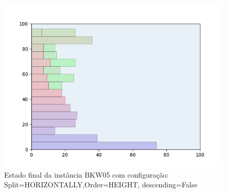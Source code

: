 \begin{figure}[H]
    \centering
    \caption[]{Estado final da instância BKW05 com configuração: Split=HORIZONTALLY,Order=HEIGHT, descending=False}
    \label{fig:bkw05-horizontally-height-false}
    \includegraphics[scale=0.5]{output/figures/bkw/bkw05/horizontally/height/false/00}
\end{figure}